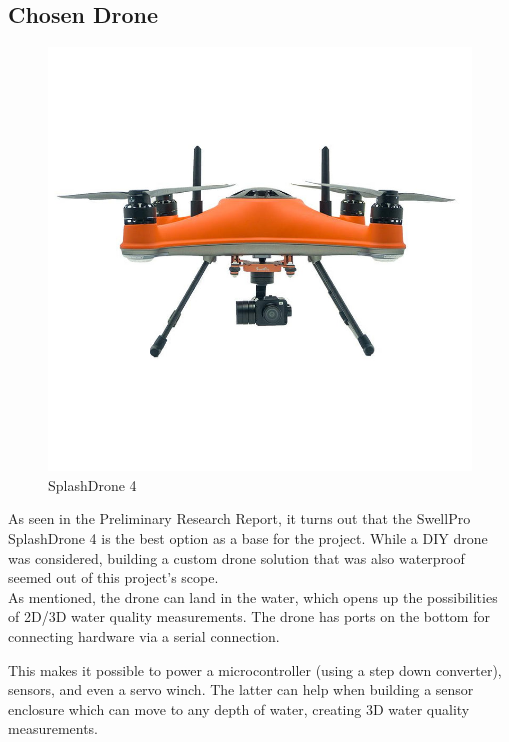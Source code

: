 \newpage
\subsection{Chosen Drone}
\begin{figure}
\includegraphics[width=1\linewidth]{070_design/chosendrone/21_splashdrone4.png}
\caption{SplashDrone 4}
\end{figure}
As seen in the Preliminary Research Report, \cite{prr} it turns out that the SwellPro SplashDrone 4 is the best option as a base for the project. While a \gls{DIY} drone was considered, building a custom drone solution that was also waterproof seemed out of this project's scope.\\

As mentioned, the drone can land in the water, which opens up the possibilities of \gls{2D}/\gls{3D} water quality measurements. The drone has ports on the bottom for connecting hardware via a serial connection. 

This makes it possible to power a microcontroller (using a step down converter), sensors, and even a servo winch. The latter can help when building a sensor enclosure which can move to any depth of water, creating \gls{3D} water quality measurements.

